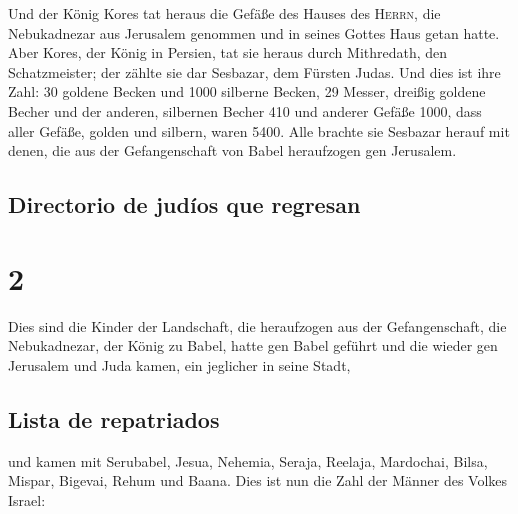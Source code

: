  Und der König Kores tat heraus die Gefäße des Hauses des
\textsc{Herrn}, die Nebukadnezar aus Jerusalem genommen und in seines
Gottes Haus getan hatte.  Aber Kores, der König in
Persien, tat sie heraus durch Mithredath, den Schatzmeister; der zählte
sie dar Sesbazar, dem Fürsten Judas.  Und dies ist ihre
Zahl: 30 goldene Becken und 1000 silberne Becken, 29 Messer,
 dreißig goldene Becher und der anderen, silbernen Becher
410 und anderer Gefäße 1000,  dass aller Gefäße, golden
und silbern, waren 5400. Alle brachte sie Sesbazar herauf mit denen, die
aus der Gefangenschaft von Babel heraufzogen gen Jerusalem.

\hypertarget{directorio-de-juduxedos-que-regresan}{%
\subsection{Directorio de judíos que
regresan}\label{directorio-de-juduxedos-que-regresan}}

\hypertarget{section-1}{%
\section{2}\label{section-1}}

 Dies sind die Kinder der Landschaft, die heraufzogen aus
der Gefangenschaft, die Nebukadnezar, der König zu Babel, hatte gen
Babel geführt und die wieder gen Jerusalem und Juda kamen, ein jeglicher
in seine Stadt,

\hypertarget{lista-de-repatriados}{%
\subsection{Lista de repatriados}\label{lista-de-repatriados}}

 und kamen mit Serubabel, Jesua, Nehemia, Seraja, Reelaja,
Mardochai, Bilsa, Mispar, Bigevai, Rehum und Baana. Dies ist nun die
Zahl der Männer des Volkes Israel:


